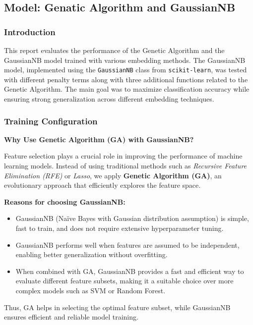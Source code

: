 \subsection{Model: Genatic Algorithm and GaussianNB}

\subsubsection{Introduction}
This report evaluates the performance of the Genetic Algorithm and the GaussianNB model trained with various embedding methods. The GaussianNB model, implemented using the \texttt{GaussianNB} class from \texttt{scikit-learn}, was tested with different penalty terms along with three additional functions related to the Genetic Algorithm. The main goal was to maximize classification accuracy while ensuring strong generalization across different embedding techniques.

\subsubsection{Training Configuration}

\textbf{Why Use Genetic Algorithm (GA) with GaussianNB?}

Feature selection plays a crucial role in improving the performance of machine learning models. Instead of using traditional methods such as \textit{Recursive Feature Elimination (RFE)} or \textit{Lasso}, we apply \textbf{Genetic Algorithm (GA)}, an evolutionary approach that efficiently explores the feature space.

${}$\\
\textbf{Reasons for choosing GaussianNB:}

\begin{itemize}
    \item GaussianNB (Naïve Bayes with Gaussian distribution assumption) is simple, fast to train, and does not require extensive hyperparameter tuning.
    \item GaussianNB performs well when features are assumed to be independent, enabling better generalization without overfitting.
    \item When combined with GA, GaussianNB provides a fast and efficient way to evaluate different feature subsets, making it a suitable choice over more complex models such as SVM or Random Forest.
\end{itemize}

Thus, GA helps in selecting the optimal feature subset, while GaussianNB ensures efficient and reliable model training.

